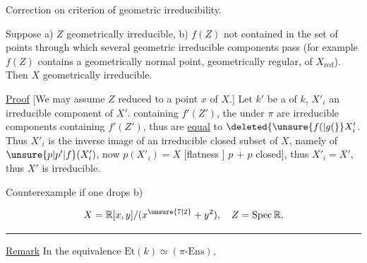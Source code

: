 Correction on criterion of geometric irreducibility.

Suppose a) $Z$ geometrically irreducible, b) $f(Z)$ not contained in the set of points  through which several geometric irreducible components pass (for example $f(Z)$ contains a geometrically normal point,   geometrically regular, of $X_{\mathrm{red}}$). Then $X$ geometrically irreducible.

\uline{Proof} [We may assume $Z$ reduced to a point  $x$ of $X$.]  Let $k'$ be a   of $k$,  $X'_i$ an irreducible component of $X'$.   containing $f'(Z')$, the  under $\pi$ are irreducible components containing $f'(Z')$, thus are \uline{equal} to $\deleted{\unsure{f(|g(}}X'_i$.  Thus $X'_i$ is the inverse image of an irreducible closed subset of $X$, namely of $\unsure{p|p'|f}(X'_i)$, now $p(X'_i)=X$ [flatness  ] $p$ + $p$ closed], thus $X'_i=X'$, thus $X'$ is irreducible.

Counterexample if one drops b)

\[
X=\mathbb{R}[x,y]/(x^{\unsure{7|2}}+y^2),\quad Z=\operatorname{Spec}\mathbb{R},
\]
\par\noindent\hfill\rule{.25\linewidth}{.4pt}\hfill\strut\par
{}

\uline{Remark} In the equivalence $\mathrm{Et}(k)\simeq(\pi\text{-}\mathrm{Ens})$,   

